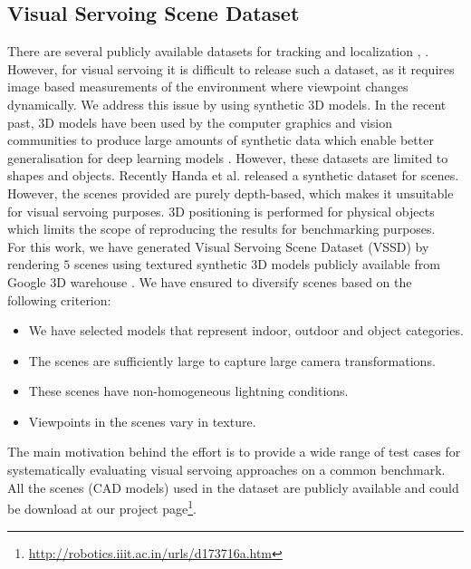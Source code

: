 \documentclass[usletter, 10 pt, conference]{ieeeconf}  %
\begin{document}
\subsection{Visual Servoing Scene Dataset}
There are several publicly available datasets for tracking and localization \cite{geiger2012we}, \cite{glocker2013real}. However, for visual servoing it is difficult to release such a dataset, as it requires image based measurements of the environment where viewpoint changes dynamically. We address this issue by using synthetic $3$D models. In the recent past, $3$D models have been used by the computer graphics and vision communities to produce large amounts of synthetic data which enable better generalisation for deep learning models \cite{shilane2004princeton}. However, these datasets are limited to shapes and objects. Recently Handa et al. \cite{handa2015scenenet} released a synthetic dataset for scenes. However, the scenes provided are purely depth-based, which makes it unsuitable for visual servoing purposes. $3$D positioning is performed for physical objects which limits the scope of reproducing the results for benchmarking purposes.\\
\indent For this work, we have generated Visual Servoing Scene Dataset (VSSD) by rendering $5$ scenes using textured synthetic $3$D models publicly available from Google $3$D warehouse \cite{google3dwarehouse}. We have ensured to diversify scenes based on the following criterion:
\begin{itemize}
    \item We have selected models that represent indoor, outdoor and object categories.
    \item The scenes are sufficiently large to capture large camera transformations.
    \item These scenes have non-homogeneous lightning conditions.
    \item Viewpoints in the scenes vary in texture.
\end{itemize}
\indent The main motivation behind the effort is to provide a wide range of test cases for systematically evaluating visual servoing approaches on a common benchmark. All the scenes (CAD models) used in the dataset are publicly available and could be download at our project page\footnote{\url{http://robotics.iiit.ac.in/urls/d173716a.htm}}.
\end{document}
